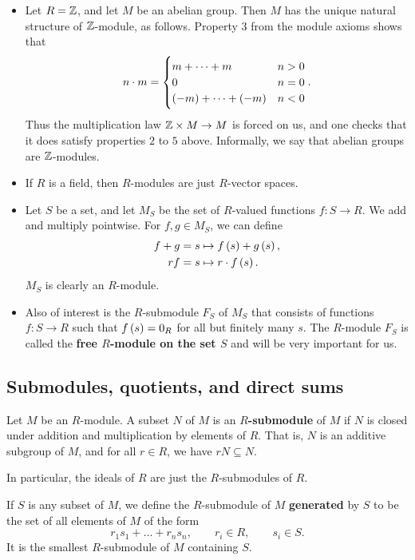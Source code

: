 \begin{example*}
\begin{itemize}
\item Let $ R = \mathbb{Z} $, and let $ M $ be an abelian group. Then $ M $ has the unique natural structure of $ \mathbb{Z} $-module, as follows. Property $ 3 $ from the module axioms shows that
$$ n \cdot m =
\begin{cases}
m + \dots + m & n > 0 \\
0 & n = 0 \\
\br{-m} + \dots + \br{-m} & n < 0
\end{cases}.
$$
Thus the multiplication law $ \mathbb{Z} \times M \to M $ is forced on us, and one checks that it does satisfy properties $ 2 $ to $ 5 $ above. Informally, we say that abelian groups are $ \mathbb{Z} $-modules.
\item If $ R $ is a field, then $ R $-modules are just $ R $-vector spaces.
\item Let $ S $ be a set, and let $ M_S $ be the set of $ R $-valued functions $ f : S \to R $. We add and multiply pointwise. For $ f, g \in M_S $, we can define
\begin{align*}
f + g & = s \mapsto f\br{s} + g\br{s}, \\
rf & = s \mapsto r \cdot f\br{s}.
\end{align*}
$ M_S $ is clearly an $ R $-module.
\item Also of interest is the $ R $-submodule $ F_S $ of $ M_S $ that consists of functions $ f : S \to R $ such that $ f\br{s} = 0_R $ for all but finitely many $ s $. The $ R $-module $ F_S $ is called the \textbf{free $ R $-module on the set $ S $} and will be very important for us.
\end{itemize}
\end{example*}

\subsection{Submodules, quotients, and direct sums}

\begin{definition}
Let $ M $ be an $ R $-module. A subset $ N $ of $ M $ is an \textbf{$ R $-submodule} of $ M $ if $ N $ is closed under addition and multiplication by elements of $ R $. That is, $ N $ is an additive subgroup of $ M $, and for all $ r \in R $, we have $ rN \subseteq N $.
\end{definition}

In particular, the ideals of $ R $ are just the $ R $-submodules of $ R $.

\begin{definition}
If $ S $ is any subset of $ M $, we define the $ R $-submodule of $ M $ \textbf{generated} by $ S $ to be the set of all elements of $ M $ of the form
$$ r_1s_1 + \dots + r_ns_n, \qquad r_i \in R, \qquad s_i \in S. $$
It is the smallest $ R $-submodule of $ M $ containing $ S $.
\end{definition}

